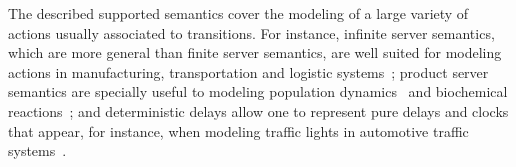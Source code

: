The described supported semantics cover the modeling of a large variety of actions
usually associated to transitions. For instance, infinite server semantics, which are
more general than finite server semantics, are well suited for modeling actions in
manufacturing, transportation and logistic systems~\cite{BODavid10}; product server semantics are
specially useful to modeling population dynamics~\cite{IPSiRe00} and biochemical
reactions~\cite{InHeGiDo08}; and deterministic delays allow one to represent pure
delays and clocks that appear, for instance, when modeling traffic lights in
automotive traffic systems~\cite{IPVaSuBoSi10}.

\newpage
